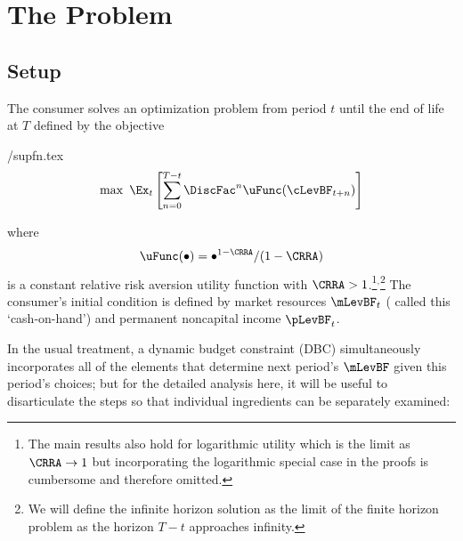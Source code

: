 \documentclass[./BufferStockTheory.tex]{subfiles}
\begin{document}
\hypertarget{The-Problem}{}
\section{The Problem}

\subsection{Setup}
\label{subsec:Setup}

The consumer solves an optimization problem from period
$t$ until the end of life at $T$ defined by the objective
\begin{verbatimwrite}{\EqDir/supfn.tex}
\begin{equation}\begin{gathered}\begin{aligned}
  \label{eq:supfn}
  \max~ \Ex_{t}\left[\sum_{n=0}^{T-t} \DiscFac^{n} \uFunc(\cLevBF_{t+n})\right]
\end{aligned}\end{gathered}\end{equation}
\end{verbatimwrite}

where
\begin{equation}\begin{gathered}\begin{aligned}
  \uFunc(\bullet)=\bullet^{1-\CRRA}/(1-\CRRA) \label{eq:crrautil}
\end{aligned}\end{gathered}\end{equation}
 is a constant relative risk aversion utility function with $\CRRA > 1$.\footnote{The main
  results also hold for logarithmic utility which is the limit as
  $\CRRA \rightarrow 1$ but incorporating the logarithmic special case
  in the proofs is cumbersome and therefore
  omitted.}$^{,}$\footnote{We will define the infinite horizon
  solution as the limit of the finite horizon problem as the horizon
  $T-t$ approaches infinity.}  The consumer's initial condition is
defined by market resources $\mLevBF_{t}$ (\cite{deatonLiqConstr}
called this `cash-on-hand') and permanent noncapital income $\pLevBF_{t}$.

In the usual treatment, a dynamic budget constraint (DBC) simultaneously incorporates
all of the elements that determine next period's $\mLevBF$ given this
period's choices; but for the detailed analysis here, it will be useful to
disarticulate the steps so that individual ingredients can be separately examined:
\end{document}
